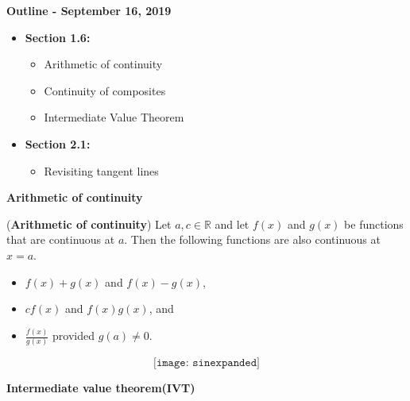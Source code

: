 \documentclass{beamer}
\begin{document}
\begin{frame}
{\bf Outline - September 16, 2019}	
\begin{itemize}
\item {\bf Section 1.6:}
\begin{itemize}
\item Arithmetic of continuity
\item Continuity of composites 
\item Intermediate Value Theorem
\end{itemize}
\item {\bf Section 2.1:}
\begin{itemize}
	\item Revisiting tangent lines
\end{itemize}
\end{itemize}
\end{frame}


\begin{frame}
\begin{center}
	{\bf \color{blue}Arithmetic of continuity}
\end{center}
\end{frame}

\begin{frame}
\begin{tcolorbox}[width=\textwidth,colback={green!20},title={},colbacktitle=yellow,coltitle=blue] 
	\begin{theorem} ({\bf Arithmetic of continuity})
		Let $a,c\in \mathbb{R}$ and let $f(x)$ and $g(x)$ be functions that are continuous at $a$. Then the following functions are also continuous at $x=a$.
		\begin{itemize}
			\item $f(x)+g(x)$ and $f(x)-g(x)$,
			\item $cf(x)$ and $f(x)g(x)$, and 
			\item $\frac{f(x)}{g(x)}$ provided $g(a)\neq 0$. 
		\end{itemize}
	\end{theorem}
\end{tcolorbox}
\end{frame}

\begin{frame}
$$\texttt{[image: sinexpanded]}$$
\end{frame}

\begin{frame}
\begin{center}
{\bf \color{blue}Intermediate value theorem(IVT)}
\end{center}
\end{frame}
\end{document}
